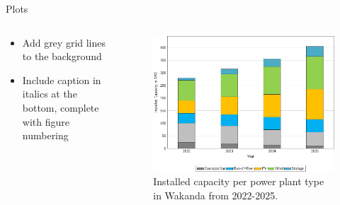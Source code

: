 \documentclass[aspectratio=169]{beamer}
\begin{document}
\begin{frame}{Plots}
\begin{columns}
\begin{column}{0.49\textwidth}
            \begin{coloredblock}
                    \begin{itemize}
                        \item \footnotesize Add grey grid lines to the background
                        \item \footnotesize Include caption in italics at the bottom, complete with figure numbering
                    \end{itemize}
            \end{coloredblock}
        \end{column}
        \begin{column}{0.49\textwidth}
            \vspace{.3cm}
            \tiny
            \begin{overprint}
                \begin{figure}[htbp]
                    \includegraphics[width=\linewidth]{figures/installed_capacity_2022-2025.pdf}
                    \caption{\centering Installed capacity per power plant type in Wakanda from 2022-2025.}
                    \label{fig:installed_capacity}
            \end{figure}
    

\end{overprint}
\end{column}
\end{columns}
\end{frame}
\end{document}
